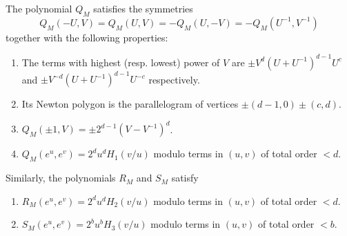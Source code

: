\documentclass[10pt,a4paper]{amsart}
\newcommand{\Z}{\mathbb{Z}}
\begin{document}
\begin{Lemma}\label{Qlemma}
The polynomial $Q_M$ satisfies the symmetries 
$$Q_M(-U,V)=Q_M(U,V)=-Q_M(U,-V)=-Q_M(U^{-1},V^{-1})$$ 
together with the following properties: 
\begin{enumerate}
\item The terms with highest (resp. lowest) power of $V$ are $\pm V^d(U+U^{-1})^{d-1}U^{c}$ and $\pm V^{-d}(U+U^{-1})^{d-1}U^{-c}$ respectively.
\item Its Newton polygon is the parallelogram of vertices $\pm (d-1,0)\pm(c,d)$.
\item $Q_M(\pm 1,V)=\pm 2^{d-1}(V-V^{-1})^d$.
\item $Q_M(e^u,e^v)=2^du^dH_1(v/u)$ modulo terms in $(u,v)$ of total order $<d$. 
\end{enumerate}
Similarly, the polynomials $R_M$ and $S_M$ satisfy
\begin{enumerate}
\item[(5)] $R_M(e^u,e^v)=2^du^dH_2(v/u)$  modulo terms in $(u,v)$ of total order $<d$. 
\item[(6)] $S_M(e^u,e^v)=2^bu^bH_3(v/u)$ modulo terms in $(u,v)$ of total order $<b$.  
\end{enumerate}
\end{Lemma}
\end{document}
